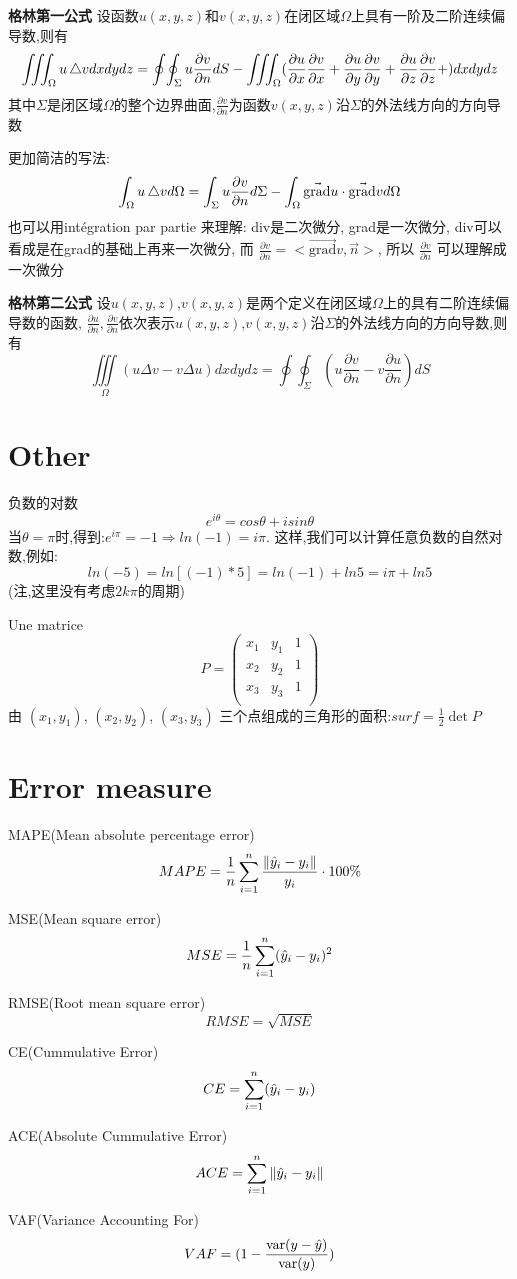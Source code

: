 \documentclass{book}
\begin{document}
\bigskip
\textbf{格林第一公式}
设函数$u(x,y,z)$和$v(x,y,z)$在闭区域$\Omega$上具有一阶及二阶连续偏导数,则有
$$\iiint_{\Omega} u\mathop{}\!\mathbin\bigtriangleup v dxdydz
=
\oint\!\oint_{\Sigma} u \frac{\partial v}{\partial n}dS -
\iiint_{\Omega}(
\frac{\partial  u}{\partial x}\frac{\partial v}{\partial x}+
\frac{\partial  u}{\partial y}\frac{\partial v}{\partial y}+
\frac{\partial  u}{\partial z}\frac{\partial v}{\partial z}+
)dxdydz$$
其中$\Sigma$是闭区域$\Omega$的整个边界曲面,$\frac{\partial v}{\partial n}$为函数$v(x,y,z)$沿$\Sigma$的外法线方向的方向导数

更加简洁的写法:
$$ \int_{\Omega}u \mathop{}\!\mathbin\bigtriangleup v d\Omega = \int_{\Sigma}u \frac{\partial v}{\partial n}d\Sigma - \int_{\Omega} \vec{\mbox{grad}}u \cdot \vec{\mbox{grad}} v d\Omega $$
也可以用int\'egration par partie 来理解:
div是二次微分, grad是一次微分, div可以看成是在grad的基础上再来一次微分, 而
$ \frac{\partial  v}{\partial n} = <\vec{\mbox{grad}} v,\vec{n}>$, 所以
$\frac{\partial  v}{\partial n}$ 可以理解成一次微分

\bigskip
\textbf{格林第二公式}
设$u(x,y,z)$,$v(x,y,z)$是两个定义在闭区域$\Omega$上的具有二阶连续偏导数的函数,
$\frac{\partial u}{\partial n},\frac{\partial v}{\partial n}$依次表示$u(x,y,z)$,$v(x,y,z)$沿$\Sigma$的外法线方向的方向导数,则有
$$\iiint\limits_{\Omega}(u\Delta v - v\Delta u)dxdydz=\oint\!\oint_{\Sigma}(u \frac{\partial v}{\partial n}-v\frac{\partial u}{\partial n})dS$$

\section{Other}
负数的对数
$$e^{i\theta}=cos\theta+isin\theta$$
当$\theta=\pi$时,得到:$e^{i\pi}=-1\Rightarrow ln(-1)=i\pi$.
这样,我们可以计算任意负数的自然对数,例如:
$$ln(-5)=ln[(-1)*5]=ln(-1)+ln5=i\pi+ln5$$
(注,这里没有考虑$2k\pi$的周期)

Une matrice
$$
P=
\left(
             \begin{array}{ccc}
               x_1 & y_1 & 1 \\
               x_2 & y_2 & 1 \\
               x_3 & y_3 & 1 \\
             \end{array}
          \right)
$$
由 $(x_1,y_1)$, $(x_2,y_2)$, $(x_3,y_3)$ 三个点组成的三角形的面积:$surf = \frac{1}{2}\det{P}$

\section{Error measure}
MAPE(Mean absolute percentage error)
$$ MAPE = \dfrac{1}{n} \sum_{i=1}^n \dfrac{\left\Vert \hat{y}_i - y_i\right\Vert}{y_i} \cdot 100\%$$

MSE(Mean square error)
$$MSE = \dfrac{1}{n} \sum_{i=1}^n (\hat{y}_i - y_i)^2$$

RMSE(Root mean square error)
$$RMSE  = \sqrt{MSE}$$

CE(Cummulative Error)
$$CE = \sum_{i=1}^n (\hat{y}_i - y_i)$$

ACE(Absolute Cummulative Error)
$$ACE = \sum_{i=1}^n \left\Vert \hat{y}_i - y_i\right\Vert$$

VAF(Variance Accounting For)
$$VAF = (1 - \dfrac{\operatorname{var}(y - \hat{y})}{\operatorname{var}(y)})$$
\end{document}
